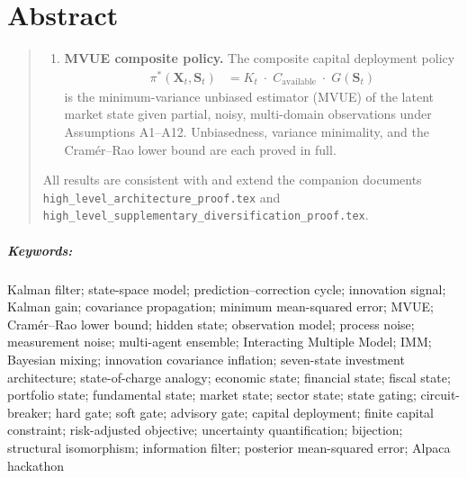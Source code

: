 \documentclass[12pt,openany]{book}
\numberwithin{equation}{chapter}
\theoremstyle{plain}
\theoremstyle{definition}
\theoremstyle{remark}
\newenvironment{abstract}{%
  \chapter*{Abstract}
  \begin{quote}\small
}{%
  \end{quote}
}
\newenvironment{keywords}{%
  \paragraph*{Keywords:}
}{}
\def\mathcal#1{#1}%
\begin{document}
\begin{abstract}
\begin{enumerate}[label=(\roman*), leftmargin=2.5em, itemsep=3pt,
                  parsep=0pt, topsep=3pt]
\begin{align*}
          G(\mathbf{S}_t)
          &= \prod_{d=1}^{7} g_d\!\bigl(\mathcal{S}_t^{(d)}\bigr)
          \;\in\;[0,1]
        \end{align*}
        is well-defined, measurable, non-negative, and satisfies
        $G(\mathbf{S}_t)=0$ whenever any component
        $\mathcal{S}_t^{(d)} \leq \theta_d^*$ for its critical
        threshold $\theta_d^*\in(0,1)$.  The zero-gate condition is
        proved under minimal regularity; the layered circuit-breaker
        hierarchy (hard, soft, advisory) is formalised.
  \item \textbf{MVUE composite policy.}
        The composite capital deployment policy
        \begin{align*}
          \pi^*(\mathbf{X}_t, \mathbf{S}_t)
          &= K_t \;\cdot\; C_{\mathrm{available}}
             \;\cdot\; G(\mathbf{S}_t)
        \end{align*}
        is the minimum-variance unbiased estimator (MVUE) of the
        latent market state given partial, noisy, multi-domain
        observations under Assumptions A1--A12.  Unbiasedness,
        variance minimality, and the Cram\'{e}r--Rao lower bound
        are each proved in full.
\end{enumerate}

\medskip
\noindent
All results are consistent with and extend the companion documents
\texttt{high\_level\_architecture\_proof.tex} and
\texttt{high\_level\_supplementary\_diversification\_proof.tex}.
\end{abstract}

\begin{keywords}
Kalman filter; state-space model; prediction--correction cycle;
innovation signal; Kalman gain; covariance propagation; minimum
mean-squared error; MVUE; Cram\'{e}r--Rao lower bound; hidden state;
observation model; process noise; measurement noise; multi-agent
ensemble; Interacting Multiple Model; IMM; Bayesian mixing;
innovation covariance inflation; seven-state investment architecture;
state-of-charge analogy; economic state; financial state; fiscal
state; portfolio state; fundamental state; market state; sector
state; state gating; circuit-breaker; hard gate; soft gate; advisory
gate; capital deployment; finite capital constraint; risk-adjusted
objective; uncertainty quantification; bijection; structural
isomorphism; information filter; posterior mean-squared error;
Alpaca hackathon
\end{keywords}

\end{document}
